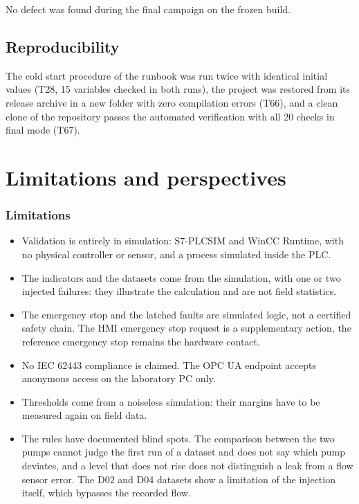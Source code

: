\documentclass[11pt,a4paper]{report}
\begin{document}
	No defect was found during the final campaign on the frozen build.
	
	\section{Reproducibility}
	
	The cold start procedure of the runbook was run twice with identical initial values (T28, 15 variables checked in both runs), the project was restored from its release archive in a new folder with zero compilation errors (T66), and a clean clone of the repository passes the automated verification with all 20 checks in final mode (T67).
	
	\chapter{Limitations and perspectives}\label{ch:limits}
	
	\subsection*{Limitations}
	
	\begin{itemize}
		\item Validation is entirely in simulation: S7-PLCSIM and WinCC Runtime, with no physical controller or sensor, and a process simulated inside the PLC.
		\item The indicators and the datasets come from the simulation, with one or two injected failures: they illustrate the calculation and are not field statistics.
		\item The emergency stop and the latched faults are simulated logic, not a certified safety chain. The HMI emergency stop request is a supplementary action, the reference emergency stop remains the hardware contact.
		\item No IEC 62443 compliance is claimed. The OPC UA endpoint accepts anonymous access on the laboratory PC only.
		\item Thresholds come from a noiseless simulation: their margins have to be measured again on field data.
		\item The rules have documented blind spots. The comparison between the two pumps cannot judge the first run of a dataset and does not say which pump deviates, and a level that does not rise does not distinguish a leak from a flow sensor error. The D02 and D04 datasets show a limitation of the injection itself, which bypasses the recorded flow.
	\end{itemize}
	
\end{document}
